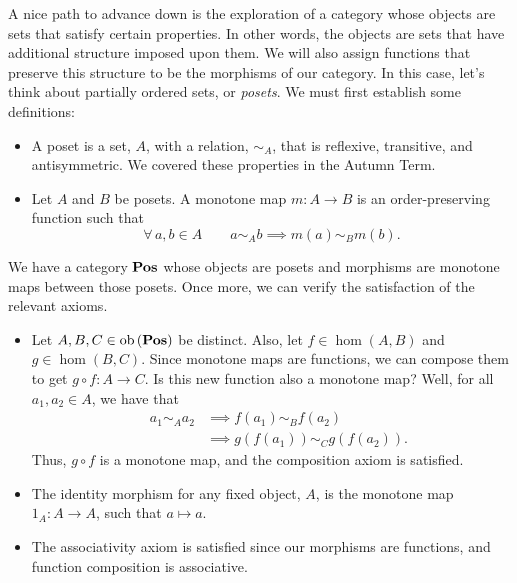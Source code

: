 A nice path to advance down is the exploration of a category whose objects are
sets that satisfy certain properties. In other words, the objects are sets that
have additional structure imposed upon them. We will also assign functions that
preserve this structure to be the morphisms of our category. In this case, let's
think about partially ordered sets, or \emph{posets}. We must first establish
some definitions:
\begin{itemize}
        \item A poset is a set, $A$, with a relation, $\sim_A$, that is
                reflexive, transitive, and antisymmetric. We covered these
                properties in the Autumn Term.
        \item Let $A$ and $B$ be posets. A monotone map $m \colon A \to B$ is
                an order-preserving function such that
                \begin{equation}
                        \forall\, a, b \in A \qquad a \sim_A b
                        \implies m(a) \sim_B m(b).
                \end{equation}
\end{itemize}
We have a category $\operatorname{\mathbf{Pos}}$ whose objects are posets and morphisms are monotone
maps between those posets. Once more, we can verify the satisfaction of the
relevant axioms.
\begin{itemize}
        \item Let $A, B, C \in \operatorname{ob}{(\operatorname{\mathbf{Pos}})}$ be distinct. Also, let
                $f \in \hom (A, B)$ and $g \in \hom (B, C)$. Since monotone maps
                are functions, we can compose them to get  $g \circ f \colon A
                \to C$. Is this new function also a monotone map? Well, for
                all $a_1, a_2 \in A$, we have that
                \begin{align}
                        \quad a_1 \sim_A a_2 &\implies f(a_1) \sim_B f(a_2) \\
                        &\implies g(f(a_1)) \sim_C g(f(a_2)).
                \end{align}
                Thus, $g \circ f$ is a monotone map, and the composition axiom
                is satisfied.
        \item The identity morphism for any fixed object, $A$, is the
                monotone map $1_A \colon A \to A$, such that $a \mapsto a$.
        \item The associativity axiom is satisfied since our morphisms are
                functions, and function composition is associative.
\end{itemize}

